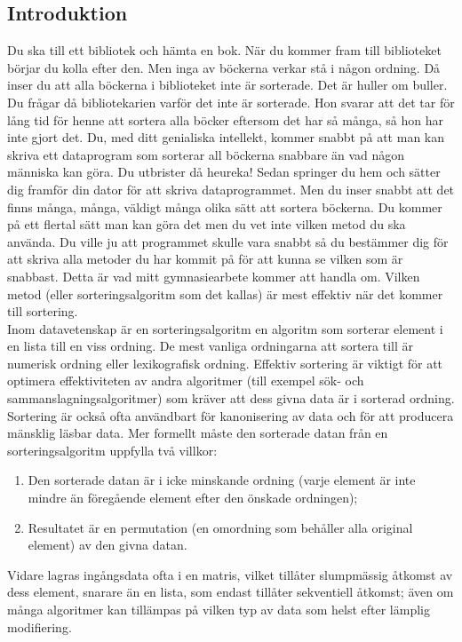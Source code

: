 \documentclass[twocolumn, a4, twoside]{article}
\begin{document}
\subsection{Introduktion}
Du ska till ett bibliotek och hämta en bok. När du kommer fram till biblioteket börjar du kolla efter den. Men inga av böckerna verkar stå i någon ordning. Då inser du att alla böckerna i biblioteket inte är sorterade. Det är huller om buller. Du frågar då bibliotekarien varför det inte är sorterade. Hon svarar att det tar för lång tid för henne att sortera alla böcker eftersom det har så många, så hon har inte gjort det. Du, med ditt genialiska intellekt, kommer snabbt på att man kan skriva ett dataprogram som sorterar all böckerna snabbare än vad någon människa kan göra. Du utbrister då heureka! Sedan springer du hem och sätter dig framför din dator för att skriva dataprogrammet. Men du inser snabbt att det finns många, många, väldigt många olika sätt att sortera böckerna. Du kommer på ett flertal sätt man kan göra det men du vet inte vilken metod du ska använda. Du ville ju att programmet skulle vara snabbt så du bestämmer dig för att skriva alla metoder du har kommit på för att kunna se vilken som är snabbast. Detta är vad mitt gymnasiearbete kommer att handla om. Vilken metod (eller sorteringsalgoritm som det kallas) är mest effektiv när det kommer till sortering.\\
Inom datavetenskap är en sorteringsalgoritm en algoritm som sorterar element i en lista till en viss ordning. De mest vanliga ordningarna att sortera till är numerisk ordning eller lexikografisk ordning. Effektiv sortering är viktigt för att optimera effektiviteten av andra algoritmer (till exempel sök- och sammanslagningsalgoritmer) som kräver att dess givna data är i sorterad ordning. Sortering är också ofta användbart för kanonisering av data och för att producera mänsklig läsbar data. Mer formellt måste den sorterade datan från en sorteringsalgoritm uppfylla två villkor:\cite{1, 2}
\begin{enumerate}
    \item Den sorterade datan är i icke minskande ordning (varje element är inte mindre än föregående element efter den önskade ordningen);
    \item Resultatet är en permutation (en omordning som behåller alla original element) av den givna datan.
\end{enumerate}
Vidare lagras ingångsdata ofta i en matris, vilket tillåter slumpmässig åtkomst av dess element, snarare än en lista, som endast tillåter sekventiell åtkomst; även om många algoritmer kan tillämpas på vilken typ av data som helst efter lämplig modifiering.\\
\end{document}
